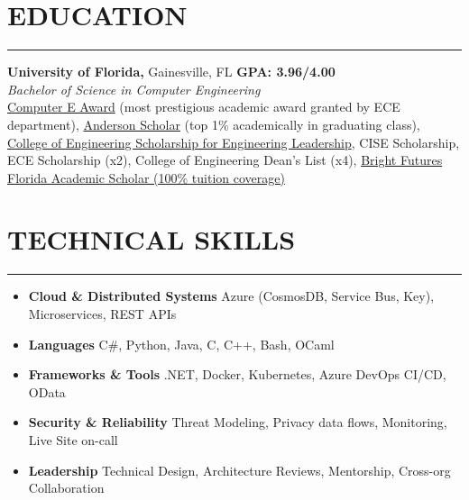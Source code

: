 \documentclass[11pt]{article}
\begin{document}
\vspace{0.6cm}
\section*{EDUCATION}
\hrule
\vspace{0.3cm}
\noindent
\textbf{University of Florida,} Gainesville, FL \hfill\textbf{GPA: 3.96/4.00}\\
\textit{Bachelor of Science in Computer Engineering}\\
    \href{https://www.ece.ufl.edu/people/student-awards/}
            {Computer E Award} (most prestigious academic award granted by ECE department),
    \href{https://clas.ufl.edu/undergraduate/anderson-scholars/}
            {Anderson Scholar} (top 1\% academically in graduating class),
    \href{https://www.eng.ufl.edu/leadership/students/scholarships/thomas-o-hunter-leadership/}
            {College of Engineering Scholarship for Engineering Leadership},
    CISE Scholarship,
    ECE Scholarship (x2),
    College of Engineering Dean\rq s List (x4),
    \href{https://en.wikipedia.org/wiki/Bright_Futures_Scholarship_Program}{Bright Futures Florida Academic Scholar (100\% tuition coverage)}

\vspace{0.6cm}
\section*{TECHNICAL SKILLS}
\hrule
\vspace{0.3cm}

\begin{itemize}[noitemsep,nolistsep, label={}]

	
    \item \textbf{Cloud \& Distributed Systems} Azure (CosmosDB, Service Bus, Key), Microservices, REST APIs
    \item \textbf{Languages} C\#, Python, Java, C, C++, Bash, OCaml
    \item \textbf{Frameworks \& Tools} .NET, Docker, Kubernetes, Azure DevOps CI/CD, OData
    \item \textbf{Security \& Reliability} Threat Modeling, Privacy data flows, Monitoring, Live Site on-call
    \item \textbf{Leadership} Technical Design, Architecture Reviews, Mentorship, Cross-org Collaboration
\end{itemize}
\end{document}
